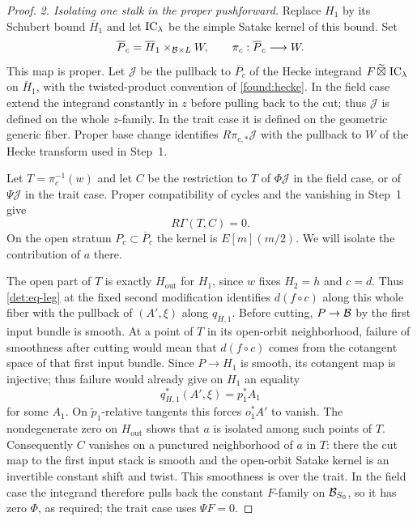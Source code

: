 \begin{proof}
\smallskip\noindent
\emph{2. Isolating one stalk in the proper pushforward.}
Replace $H_1$ by its Schubert bound $\overline H_1$ and let
$\operatorname{IC}_\lambda$ be the simple Satake kernel of this bound. Set
\[
 \overline P_c=\overline H_1\times_{\mathcal B\times L}W,
 \qquad \pi_c:\overline P_c\longrightarrow W.
\]
This map is proper. Let $\mathcal J$ be the pullback to $\overline P_c$
of the Hecke integrand $F\,\widetilde\boxtimes\,\operatorname{IC}_\lambda$ on
$\overline H_1$, with the twisted-product convention of
\eqref{found:hecke}. In the field case extend the integrand constantly
in $z$ before pulling back to the cut; thus $\mathcal J$ is defined on
the whole $z$-family. In the trait case it is defined on the geometric
generic fiber. Proper base change identifies $R\pi_{c,*}\mathcal J$
with the pullback to $W$ of the Hecke transform used in Step~1.

Let $T=\pi_c^{-1}(w)$ and let $C$ be the restriction to $T$ of
$\Phi\mathcal J$ in the field case, or of $\Psi\mathcal J$ in the
trait case. Proper compatibility of cycles and the vanishing in Step~1
give
\begin{equation}\label{det:eq-proper-zero}
                            R\Gamma(T,C)=0.
\end{equation}
On the open stratum $P_c\subset\overline P_c$ the kernel is
$E[m](m/2)$. We will isolate the contribution of $a$ there.

The open part of $T$ is exactly $H_{\mathrm{out}}$ for $H_1$,
since $w$ fixes $H_2=h$ and $c=d$. Thus \eqref{det:eq-leg} at the
fixed second modification identifies $d(f\circ c)$ along this whole
fiber with the pullback of $(A',\xi)$ along $q_{H,1}$.
Before cutting, $P\to\mathcal B$ by the first input bundle is smooth. At a
point of $T$ in its open-orbit neighborhood, failure of smoothness after
cutting would mean that $d(f\circ c)$ comes from the cotangent space of
that first input bundle. Since $P\to H_1$ is smooth, its
cotangent map is injective; thus failure would already give on $H_1$
an equality
\[
                         q_{H,1}^*(A',\xi)=p_1^*A_1
\]
for some $A_1$.  On $\widetilde p_1$-relative tangents this forces
$o_1^*A'$ to vanish.  The nondegenerate zero on $H_{\mathrm{out}}$
shows that $a$ is isolated among such points of $T$.  Consequently $C$
vanishes on a punctured neighborhood of $a$ in $T$: there the cut map
to the first input stack is smooth and the open-orbit Satake kernel is
an invertible constant shift and twist.
This smoothness is over the trait.  In the field case the integrand
therefore pulls back the constant $F$-family on $\mathcal B_{S_0}$, so it has zero
$\Phi$, as required; the trait case uses $\Psi F=0$.


\end{proof}
